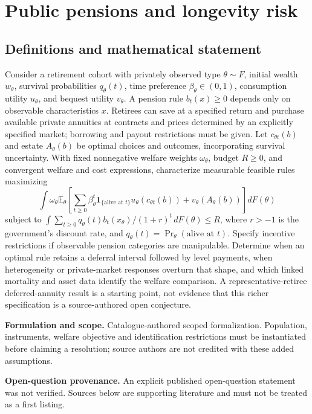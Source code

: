\documentclass[11pt]{article}
\begin{document}
\section*{Public pensions and longevity risk}\label{30007761}
\subsection{Definitions and mathematical statement}
Consider a retirement cohort with privately observed type \(\theta\sim F\), initial wealth \(w_\theta\), survival probabilities \(q_\theta(t)\), time preference \(\beta_\theta\in(0,1)\), consumption utility \(u_\theta\), and bequest utility \(v_\theta\). A pension rule \(b_t(x)\geq0\) depends only on observable characteristics \(x\). Retirees can save at a specified return and purchase available private annuities at contracts and prices determined by an explicitly specified market; borrowing and payout restrictions must be given. Let \(c_{\theta t}(b)\) and estate \(A_\theta(b)\) be optimal choices and outcomes, incorporating survival uncertainty. With fixed nonnegative welfare weights \(\omega_\theta\), budget \(R\geq0\), and convergent welfare and cost expressions, characterize measurable feasible rules maximizing
\[\int \omega_\theta\mathbb E_\theta\!\left[\sum_{t\geq0}\beta_\theta^t\mathbf1_{\{\text{alive at }t\}}u_\theta(c_{\theta t}(b))+v_\theta(A_\theta(b))\right]dF(\theta)\]
subject to \(\int\sum_{t\geq0}q_\theta(t)b_t(x_\theta)/(1+r)^t\,dF(\theta)\leq R\), where \(r>-1\) is the government's discount rate, and \(q_\theta(t)=\Pr_\theta(\text{alive at }t)\). Specify incentive restrictions if observable pension categories are manipulable. Determine when an optimal rule retains a deferral interval followed by level payments, when heterogeneity or private-market responses overturn that shape, and which linked mortality and asset data identify the welfare comparison. A representative-retiree deferred-annuity result is a starting point, not evidence that this richer specification is a source-authored open conjecture.

\par\textbf{Formulation and scope.} Catalogue-authored scoped formalization. Population, instruments, welfare objective and identification restrictions must be instantiated before claiming a resolution; source authors are not credited with these added assumptions.

\par\textbf{Open-question provenance.} An explicit published open-question statement was not verified. Sources below are supporting literature and must not be treated as a first listing.
\end{document}
